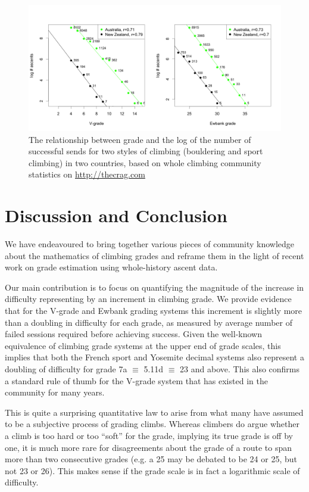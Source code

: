 \documentclass{article}
\begin{document}
\begin{figure}
\centering
\includegraphics[width=\textwidth]{figure1.png}
\caption{\small The relationship between grade and the log of the number of successful sends for two styles of climbing (bouldering and sport climbing) in two countries, based on whole climbing community statistics on \url{http://thecrag.com}}
\label{fig.oneill}
\end{figure}

\section*{Discussion and Conclusion}

We have endeavoured to bring together various pieces of community knowledge about the mathematics of climbing grades and reframe them in the light of recent work on grade estimation using whole-history ascent data.

Our main contribution is to focus on quantifying the magnitude of the increase in difficulty representing by an increment in climbing grade. We provide evidence that for the V-grade and Ewbank grading systems this increment is slightly more than a doubling in difficulty for each grade, as measured by average number of failed sessions required before achieving success. Given the well-known equivalence of climbing grade systems at the upper end of grade scales, this implies that both the French sport and Yosemite decimal systems also represent a doubling of difficulty for grade 7a $\equiv$ 5.11d $\equiv$ 23 and above. This also confirms a standard rule of thumb for the V-grade system that has existed in the community for many years.

This is quite a surprising quantitative law to arise from what many have assumed to be a subjective process of grading climbs. Whereas climbers do argue whether a climb is too hard or too ``soft'' for the grade, implying its true grade is off by one, it is much more rare for disagreements about the grade of a route to span more than two consecutive grades (e.g. a 25 may be debated to be 24 or 25, but not 23 or 26). This makes sense if the grade scale is in fact a logarithmic scale of difficulty.  
\end{document}
